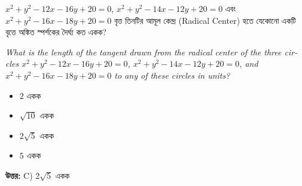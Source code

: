 \documentclass[12pt, a4paper]{article}
\begin{document}
\vspace{2em}

\begin{tcolorbox}[questionbox={প্রশ্ন (Question) 17}]
    \noindent
    $x^2 + y^2 - 12x - 16y + 20 = 0$, $x^2 + y^2 - 14x - 12y + 20 = 0$ এবং $x^2 + y^2 - 16x - 18y + 20 = 0$ বৃত্ত তিনটির আমূল কেন্দ্র (Radical Center) হতে যেকোনো একটি বৃত্তে অঙ্কিত স্পর্শকের দৈর্ঘ্য কত একক?
    
    \vspace{0.8em}
    \begin{english}
    \noindent\textit{\color{darkgray}
    What is the length of the tangent drawn from the radical center of the three circles $x^2 + y^2 - 12x - 16y + 20 = 0$, $x^2 + y^2 - 14x - 12y + 20 = 0$, and $x^2 + y^2 - 16x - 18y + 20 = 0$ to any of these circles in units?
    }
    \end{english}
\end{tcolorbox}

\begin{itemize}[label={}, leftmargin=1cm, itemsep=0.5em]
    \item[\textbf{A)}] $2$ একক
    \item[\textbf{B)}] $\sqrt{10}$ একক
    \item[\textbf{C)}] $2\sqrt{5}$ একক
    \item[\textbf{D)}] $5$ একক
\end{itemize}

\vspace{0.5em}
\begin{tcolorbox}[answerbox]
    \textbf{\color{success} উত্তর:} C) $2\sqrt{5}$ একক
\end{tcolorbox}
\vspace{1em}
\end{document}
